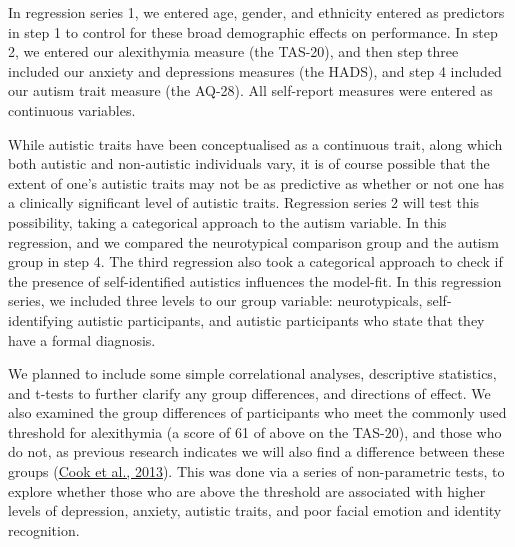 \documentclass[
]{article}
\begin{document}
In regression series 1, we entered age, gender, and ethnicity entered as predictors in step 1 to control for these broad demographic effects on performance. In step 2, we entered our alexithymia measure (the TAS-20), and then step three included our anxiety and depressions measures (the HADS), and step 4 included our autism trait measure (the AQ-28). All self-report measures were entered as continuous variables.

While autistic traits have been conceptualised as a continuous trait, along which both autistic and non-autistic individuals vary, it is of course possible that the extent of one's autistic traits may not be as predictive as whether or not one has a clinically significant level of autistic traits. Regression series 2 will test this possibility, taking a categorical approach to the autism variable. In this regression, and we compared the neurotypical comparison group and the autism group in step 4.
The third regression also took a categorical approach to check if the presence of self-identified autistics influences the model-fit. In this regression series, we included three levels to our group variable: neurotypicals, self-identifying autistic participants, and autistic participants who state that they have a formal diagnosis.

We planned to include some simple correlational analyses, descriptive statistics, and t-tests to further clarify any group differences, and directions of effect. We also examined the group differences of participants who meet the commonly used threshold for alexithymia (a score of 61 of above on the TAS-20), and those who do not, as previous research indicates we will also find a difference between these groups (\protect\hyperlink{ref-cook2013a}{Cook et al., 2013}). This was done via a series of non-parametric tests, to explore whether those who are above the threshold are associated with higher levels of depression, anxiety, autistic traits, and poor facial emotion and identity recognition.
\end{document}
